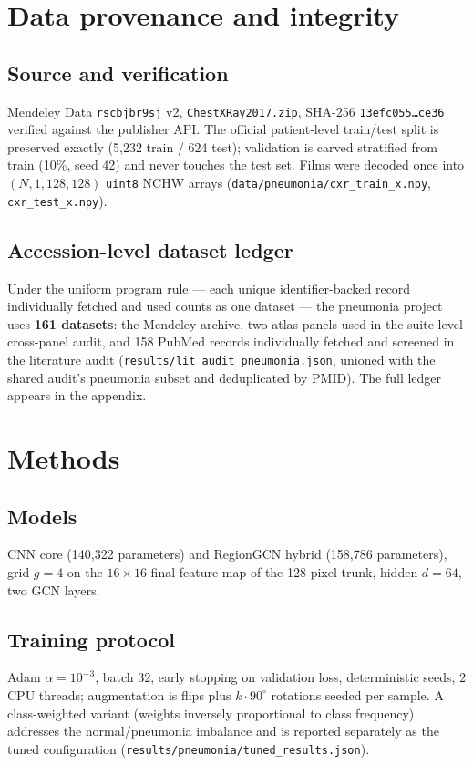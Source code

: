 \section{Data provenance and integrity}
\subsection{Source and verification}
Mendeley Data \texttt{rscbjbr9sj} v2, \texttt{ChestXRay2017.zip},
SHA-256 \texttt{13efc055\dots ce36} verified against the publisher API.
The official patient-level train/test split is preserved exactly
(5{,}232 train / 624 test); validation is carved stratified from train
(10\%, seed 42) and never touches the test set. Films were decoded once
into $(N, 1, 128, 128)$ \texttt{uint8} NCHW arrays
(\texttt{data/pneumonia/cxr\_train\_x.npy}, \texttt{cxr\_test\_x.npy}).
\subsection{Accession-level dataset ledger}
Under the uniform program rule --- each unique identifier-backed record
individually fetched and used counts as one dataset --- the pneumonia
project uses \textbf{161 datasets}: the Mendeley archive, two atlas panels
used in the suite-level cross-panel audit, and 158 PubMed records
individually fetched and screened in the literature audit
(\texttt{results/lit\_audit\_pneumonia.json}, unioned with the shared
audit's pneumonia subset and deduplicated by PMID). The full ledger
appears in the appendix.

\section{Methods}
\subsection{Models}
CNN core (140{,}322 parameters) and RegionGCN hybrid (158{,}786
parameters), grid $g{=}4$ on the $16{\times}16$ final feature map of the
128-pixel trunk, hidden $d{=}64$, two GCN layers.
\subsection{Training protocol}
Adam $\alpha{=}10^{-3}$, batch 32, early stopping on validation loss,
deterministic seeds, 2 CPU threads; augmentation is flips plus
$k\cdot90^\circ$ rotations seeded per sample. A class-weighted variant
(weights inversely proportional to class frequency) addresses the
normal/pneumonia imbalance and is reported separately as the tuned
configuration (\texttt{results/pneumonia/tuned\_results.json}).
